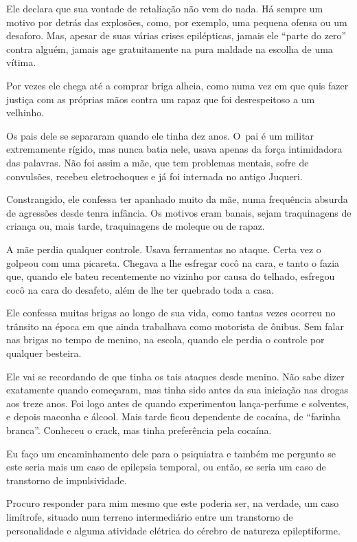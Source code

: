 Ele declara que sua vontade de retaliação não vem do nada. Há sempre um
motivo por detrás das explosões, como, por exemplo, uma pequena ofensa
ou um desaforo. Mas, apesar de suas várias crises epilépticas, jamais
ele ``parte do zero'' contra alguém, jamais age gratuitamente na pura
maldade na escolha de uma vítima.

Por vezes ele chega até a comprar briga alheia, como numa vez em que
quis fazer justiça com as próprias mãos contra um rapaz que foi
desrespeitoso a um velhinho.

\asterisc{}

Os pais dele se separaram quando ele tinha dez anos. O~pai é um militar
extremamente rígido, mas nunca batia nele, usava apenas da força
intimidadora das palavras. Não foi assim a mãe, que tem problemas
mentais, sofre de convulsões, recebeu eletrochoques e já foi internada
no antigo Juqueri.

Constrangido, ele confessa ter apanhado muito da mãe, numa frequência
absurda de agressões desde tenra infância. Os motivos eram banais, sejam
traquinagens de criança ou, mais tarde, traquinagens de moleque ou de
rapaz.

A mãe perdia qualquer controle. Usava ferramentas no ataque. Certa vez o
golpeou com uma picareta. Chegava a lhe esfregar cocô na cara, e tanto o
fazia que, quando ele bateu recentemente no vizinho por causa do
telhado, esfregou cocô na cara do desafeto, além de lhe ter quebrado
toda a casa.

Ele confessa muitas brigas ao longo de sua vida, como tantas vezes
ocorreu no trânsito na época em que ainda trabalhava como motorista de
ônibus. Sem falar nas brigas no tempo de menino, na escola, quando ele
perdia o controle por qualquer besteira.

Ele vai se recordando de que tinha os tais ataques desde menino. Não
sabe dizer exatamente quando começaram, mas tinha sido antes da sua
iniciação nas drogas aos treze anos. Foi logo antes de quando
experimentou lança-perfume e solventes, e depois maconha e álcool. Mais
tarde ficou dependente de cocaína, de ``farinha branca''. Conheceu o
crack, mas tinha preferência pela cocaína.

Eu faço um encaminhamento dele para o psiquiatra e também me pergunto se
este seria mais um caso de epilepsia temporal, ou então, se seria um
caso de transtorno de impulsividade.

Procuro responder para mim mesmo que este poderia ser, na verdade, um
caso limítrofe, situado num terreno intermediário entre um transtorno de
personalidade e alguma atividade elétrica do cérebro de natureza
epileptiforme.

